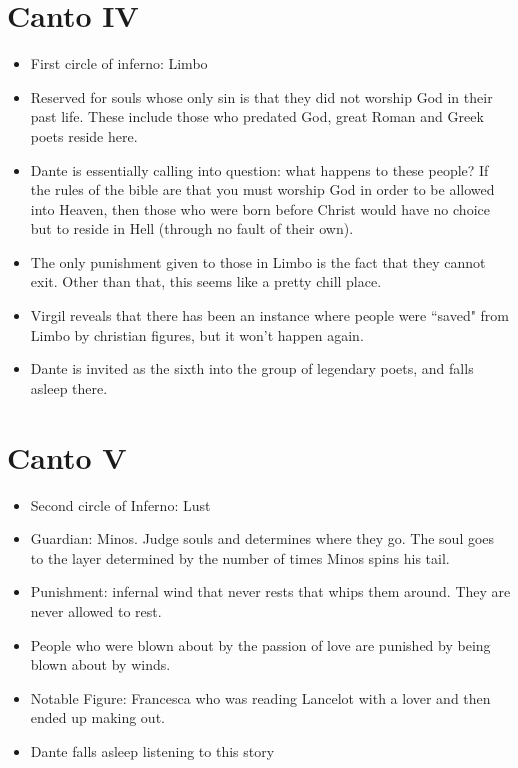 \documentclass[10pt]{article}
\begin{document}
	\section{Canto IV}
	\begin{itemize}
		\item First circle of inferno: Limbo
		\item Reserved for souls whose only sin is that they did not worship God in their past life. These 
			include those who predated God, great Roman and Greek poets reside here.
		\item Dante is essentially calling into question: what happens to these people? If the rules of 
			the bible are that you must worship God in order to be allowed into Heaven, then those who 
			were born before Christ would have no choice but to reside in Hell (through no fault 
			of their own). 
		\item The only punishment given to those in Limbo is the fact that they cannot exit. Other than that, 
			this seems like a pretty chill place. 
		\item Virgil reveals that there has been an instance where people were ``saved" from Limbo by 
			christian figures, but it won't happen again.
		\item Dante is invited as the sixth into the group of legendary poets, and falls asleep there.
	\end{itemize}
	\section{Canto V}
	\begin{itemize}
		\item Second circle of Inferno: Lust
		\item Guardian: Minos. Judge souls and determines where they go. The soul goes to the layer determined 
			by the number of times Minos spins his tail.
		\item Punishment: infernal wind that never rests that whips them around. They are never allowed to rest. 
		\item People who were blown about by the passion of love are punished by being blown about by winds.
		\item Notable Figure: Francesca who was reading Lancelot with a lover and then ended up 
			making out. 
		\item Dante falls asleep listening to this story
	\end{itemize}
\end{document}
